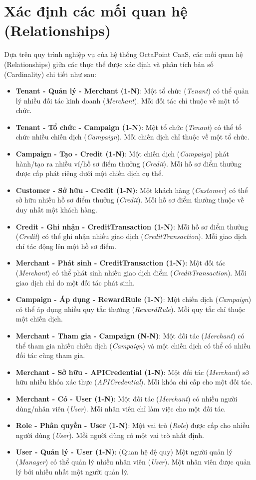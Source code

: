 \section{Xác định các mối quan hệ (Relationships)}

Dựa trên quy trình nghiệp vụ của hệ thống OctaPoint CaaS, các mối quan hệ (Relationships) giữa các thực thể được xác định và phân tích bản số (Cardinality) chi tiết như sau:

\begin{itemize}
    \item \textbf{Tenant - Quản lý - Merchant (1-N)}: Một tổ chức (\textit{Tenant}) có thể quản lý nhiều đối tác kinh doanh (\textit{Merchant}). Mỗi đối tác chỉ thuộc về một tổ chức.
    \item \textbf{Tenant - Tổ chức - Campaign (1-N)}: Một tổ chức (\textit{Tenant}) có thể tổ chức nhiều chiến dịch (\textit{Campaign}). Mỗi chiến dịch chỉ thuộc về một tổ chức.
    \item \textbf{Campaign - Tạo - Credit (1-N)}: Một chiến dịch (\textit{Campaign}) phát hành/tạo ra nhiều ví/hồ sơ điểm thưởng (\textit{Credit}). Mỗi hồ sơ điểm thưởng được cấp phát riêng dưới một chiến dịch cụ thể.
    \item \textbf{Customer - Sở hữu - Credit (1-N)}: Một khách hàng (\textit{Customer}) có thể sở hữu nhiều hồ sơ điểm thưởng (\textit{Credit}). Mỗi hồ sơ điểm thưởng thuộc về duy nhất một khách hàng.
    \item \textbf{Credit - Ghi nhận - CreditTransaction (1-N)}: Mỗi hồ sơ điểm thưởng (\textit{Credit}) có thể ghi nhận nhiều giao dịch (\textit{CreditTransaction}). Mỗi giao dịch chỉ tác động lên một hồ sơ điểm.
    \item \textbf{Merchant - Phát sinh - CreditTransaction (1-N)}: Một đối tác (\textit{Merchant}) có thể phát sinh nhiều giao dịch điểm (\textit{CreditTransaction}). Mỗi giao dịch chỉ do một đối tác phát sinh.
    \item \textbf{Campaign - Áp dụng - RewardRule (1-N)}: Một chiến dịch (\textit{Campaign}) có thể áp dụng nhiều quy tắc thưởng (\textit{RewardRule}). Mỗi quy tắc chỉ thuộc một chiến dịch.
    \item \textbf{Merchant - Tham gia - Campaign (N-N)}: Một đối tác (\textit{Merchant}) có thể tham gia nhiều chiến dịch (\textit{Campaign}) và một chiến dịch có thể có nhiều đối tác cùng tham gia.
    \item \textbf{Merchant - Sở hữu - APICredential (1-N)}: Một đối tác (\textit{Merchant}) sở hữu nhiều khóa xác thực (\textit{APICredential}). Mỗi khóa chỉ cấp cho một đối tác.
    \item \textbf{Merchant - Có - User (1-N)}: Một đối tác (\textit{Merchant}) có nhiều người dùng/nhân viên (\textit{User}). Mỗi nhân viên chỉ làm việc cho một đối tác.
    \item \textbf{Role - Phân quyền - User (1-N)}: Một vai trò (\textit{Role}) được cấp cho nhiều người dùng (\textit{User}). Mỗi người dùng có một vai trò nhất định.
    \item \textbf{User - Quản lý - User (1-N)}: (Quan hệ đệ quy) Một người quản lý (\textit{Manager}) có thể quản lý nhiều nhân viên (\textit{User}). Một nhân viên được quản lý bởi nhiều nhất một người quản lý.
\end{itemize}
